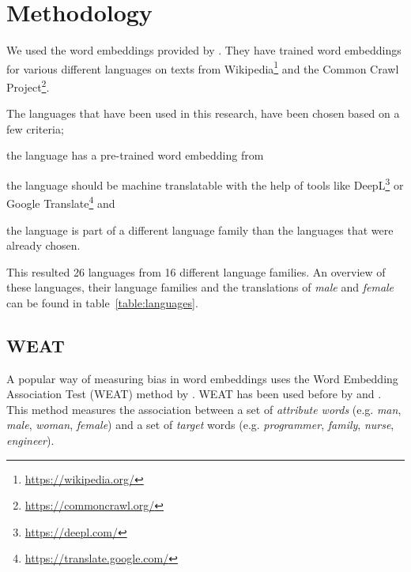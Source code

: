 \section{Methodology}
We used the word embeddings provided by \textcite{grave2018learning}. They have
trained word embeddings for various different languages on texts from
Wikipedia\footnote{\url{https://wikipedia.org/}} and
the Common Crawl Project\footnote{\url{https://commoncrawl.org/}}.

The languages that have been used in this research, have been chosen based on a
few criteria;
\begin{enumerate*}[label={(\alph*)}]
    \item the language has a pre-trained word embedding from \textcite{grave2018learning}
    \item the language should be machine translatable with the help of tools like
        DeepL\footnote{\url{https://deepl.com/}} or
        Google Translate\footnote{\url{https://translate.google.com/}} and
    \item the language is part of a different language family than the languages that
    were already chosen.
\end{enumerate*}
This resulted 26 languages from 16 different language families. An overview of these languages, their language families and the translations of \textit{male} and \textit{female}
can be found in table~\ref{table:languages}.

\subsection{WEAT} \label{section:method:weat}
A popular way of measuring bias in word embeddings uses the 
Word Embedding Association Test (WEAT) method by
\textcite{caliskan_2017_semantics_language_corpora}. 
WEAT has been used before by \textcite{gonen-goldberg-2019-lipstick-pig}
and \textcite{10.1145/3306618.3314270}.
This method measures the
association between a set of \textit{attribute words} (e.g. \textit{man}, \textit{male},
\textit{woman}, \textit{female}) 
and a set of \textit{target} words (e.g. \textit{programmer}, \textit{family},
\textit{nurse}, \textit{engineer}). 

